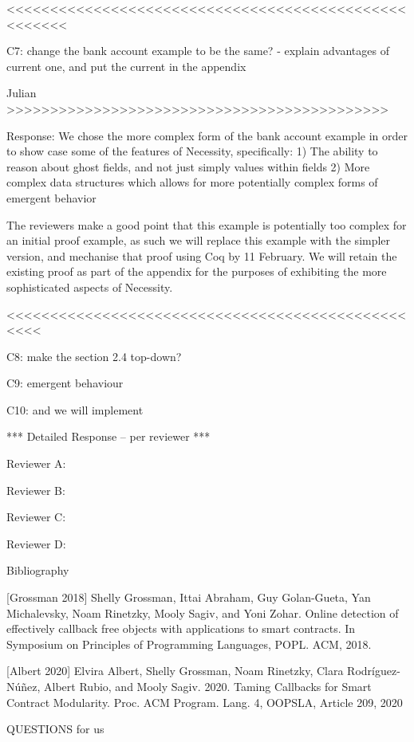 <<<<<<<<<<<<<<<<<<<<<<<<<<<<<<<<<<<<<<<<<<<<<<<<<<<<<

C7: change the bank account example to be the same?
- explain advantages of current one, and put the current in the appendix

Julian >>>>>>>>>>>>>>>>>>>>>>>>>>>>>>>>>>>>>>>>>>>>

Response:
We chose the more complex form of the bank account example in order to show case some of the features of Necessity, specifically:
1) The ability to reason about ghost fields, and not just simply values within fields
2) More complex data structures which allows for more potentially complex forms of emergent behavior

The reviewers make a good point that this example is potentially too complex for an initial proof example, as such we will 
replace this example with the simpler version, and mechanise that proof using Coq by 11 February. We will retain the existing proof as part 
of the appendix for the purposes of exhibiting the more sophisticated aspects of Necessity.


<<<<<<<<<<<<<<<<<<<<<<<<<<<<<<<<<<<<<<<<<<<<<<<<<<

C8: make the section 2.4 top-down?

C9: emergent behaviour 

C10: and we will implement
 


*** Detailed Response -- per reviewer ***

Reviewer A:

Reviewer B:

Reviewer C:

Reviewer D:

Bibliography

[Grossman 2018] Shelly Grossman, Ittai Abraham, Guy Golan-Gueta, Yan Michalevsky, Noam Rinetzky, Mooly Sagiv, and Yoni Zohar. Online detection of effectively callback free objects with applications to smart contracts. In Symposium on Principles of Programming Languages, POPL. ACM, 2018.

[Albert 2020] Elvira Albert, Shelly Grossman, Noam Rinetzky, Clara Rodríguez-Núñez, Albert Rubio, and Mooly Sagiv. 2020. Taming Callbacks for Smart Contract Modularity. Proc. ACM Program. Lang. 4, OOPSLA, Article 209, 2020


QUESTIONS for us